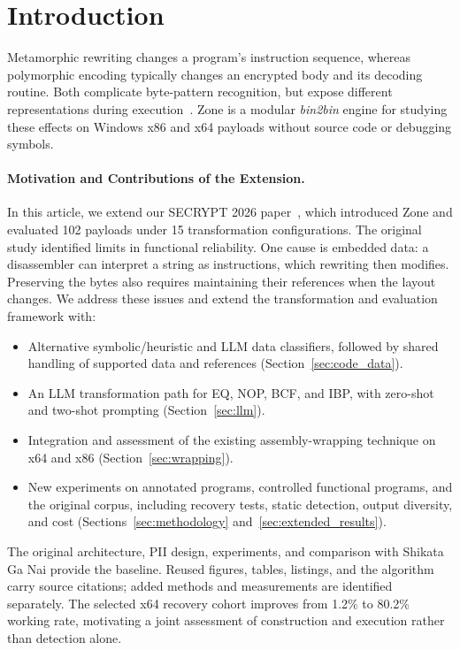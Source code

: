 \documentclass[runningheads]{llncs}
\begin{document}
\section{Introduction}\label{sec:introduction}
Metamorphic rewriting changes a program's instruction sequence, whereas
polymorphic encoding typically changes an encrypted body and its decoding
routine. Both complicate byte-pattern recognition, but expose different
representations during execution~\cite{PEsurveybible,metamorphic1,metamorphic2}.
Zone is a modular \emph{bin2bin} engine for studying these effects on
Windows x86 and x64 payloads without source code or debugging symbols.

\paragraph{Motivation and Contributions of the Extension.}
In this article, we extend our SECRYPT 2026 paper~\cite{zone_secrypt_2026},
which introduced Zone and evaluated 102 payloads under 15 transformation
configurations. The original study identified limits in functional reliability.
One cause is embedded data: a disassembler can interpret a string as
instructions, which rewriting then modifies. Preserving the bytes also
requires maintaining their references when the layout changes. We address
these issues and extend the transformation and evaluation framework with:
\begin{itemize}
\item Alternative symbolic/heuristic and LLM data classifiers, followed by
shared handling of supported data and references
(Section~\ref{sec:code_data}).
\item An LLM transformation path for EQ, NOP, BCF, and IBP, with zero-shot
and two-shot prompting (Section~\ref{sec:llm}).
\item Integration and assessment of the existing assembly-wrapping
technique on x64 and x86 (Section~\ref{sec:wrapping}).
\item New experiments on annotated programs, controlled functional
programs, and the original corpus, including recovery tests, static
detection, output diversity, and cost
(Sections~\ref{sec:methodology} and~\ref{sec:extended_results}).
\end{itemize}

The original architecture, PII design, experiments, and comparison with
Shikata Ga Nai provide the baseline. Reused figures, tables, listings, and
the algorithm carry source citations; added methods and measurements are
identified separately. The selected x64 recovery cohort improves from
1.2\% to 80.2\% working rate, motivating a joint assessment of construction
and execution rather than detection alone.
\end{document}
